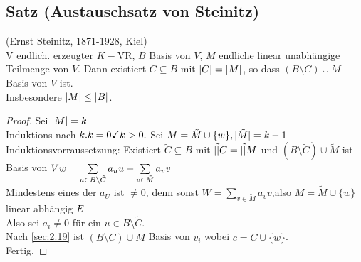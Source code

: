 \subsection{Satz (Austauschsatz von Steinitz)}\label{sec:2.20}
\hfill(Ernst Steinitz, 1871-1928, Kiel)\\
V endlich. erzeugter $K-$VR, $B$ Basis von $V$, $M$ endliche linear unabhängige Teilmenge von $V$. Dann existiert $C \subseteq B$ mit $\lvert C \rvert = \lvert M \rvert$, so dass $(B \setminus C) \cup M$ Basis von $V$ ist.\\
Insbesondere $\lvert M \rvert \leq \lvert B \rvert$.\\
\begin{proof}
Sei $\lvert M \rvert = k$\\
Induktions nach $k.\\
k = 0 \checkmark\\
k > 0.$ Sei $M = \tilde{M} \cup \{w\}, \lvert \tilde{M} \rvert= k - 1$\\
Induktionsvorraussetzung: Existiert $\tilde{C} \subseteq B$ mit $\lvert \tilde \rvert{C} = \lvert \tilde \rvert{M}$ und $(B \setminus\tilde{C}) \cup \tilde{M}$ ist Basis von $V\\
w = \sum\limits_{u\in B \setminus \tilde{C}}^{}a_uu + \sum\limits_{v \in \tilde{M}}^{}a_vv$\\
Mindestens eines der $a_U$ ist $\ne 0$, denn sonst $W = \sum\limits_{v \in \tilde{M}}^{} a_vv$,also $M = \tilde{M} \cup \{w\}$ linear abhängig $\Lightning$\\
Also sei $a_i \ne 0$ für ein $u \in B \setminus \tilde{C}$.\\
Nach \ref{sec:2.19} ist $(B \setminus C) \cup M$ Basis von $v_i$ wobei $c = \tilde{C} \cup \{w\}$.\\
Fertig.
\end{proof}
